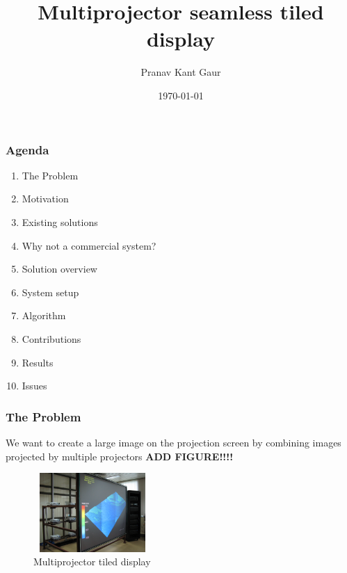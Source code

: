 \documentclass{beamer}
\title{Multiprojector seamless tiled display}
\author{Pranav Kant Gaur}
\institute{Graphics and Visualization section}
\date{\today}
\begin{document}
\begin{frame}
\titlepage
\end{frame}

\begin{frame}
\frametitle{Agenda}
\begin{enumerate}
\item The Problem 
\item Motivation
\item Existing solutions
\item Why not a commercial system?
\item Solution overview
\item System setup
\item Algorithm 
\item Contributions
\item Results
\item Issues
\end{enumerate}
\end{frame}

\begin{frame}
\frametitle{The Problem}
We want to create a large image on the projection screen by combining images projected by multiple projectors \textbf{ADD FIGURE!!!!}

\begin{figure}
\includegraphics[width=4.5cm,height=3cm]{figures/system_setup.jpg}
\caption{Multiprojector tiled display}
\end{figure}

\end{frame}
\end{document}
